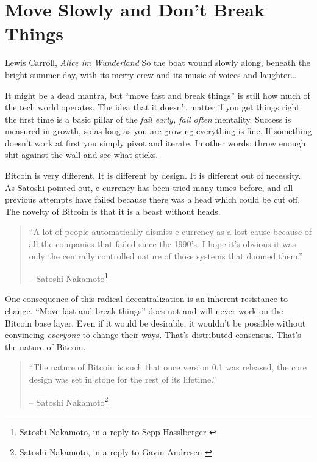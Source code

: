 \chapter{Move Slowly and Don't Break Things}
\label{les:18}

\begin{chapquote}{Lewis Carroll, \textit{Alice im Wunderland}}
So the boat wound slowly along, beneath the bright summer-day, with its merry crew and its music of voices and laughter\ldots
\end{chapquote}

It might be a dead mantra, but \enquote{move fast and break things} is still how
much of the tech world operates. The idea that it doesn't matter if you
get things right the first time is a basic pillar of the \textit{fail early,
fail often} mentality. Success is measured in growth, so as long as you
are growing everything is fine. If something doesn't work at first you
simply pivot and iterate. In other words: throw enough shit against the
wall and see what sticks.

Bitcoin is very different. It is different by design. It is different
out of necessity. As Satoshi pointed out, e-currency has been tried
many times before, and all previous attempts have failed because there
was a head which could be cut off. The novelty of Bitcoin is that it is
a beast without heads.

\begin{quotation}\begin{samepage}
\enquote{A lot of people automatically dismiss e-currency as a lost cause
because of all the companies that failed since the 1990's. I hope it's
obvious it was only the centrally controlled nature of those systems
that doomed them.}
\begin{flushright} -- Satoshi Nakamoto\footnote{Satoshi Nakamoto, in a reply to Sepp Hasslberger \cite{satoshi-centralized-nature}}
\end{flushright}\end{samepage}\end{quotation}

One consequence of this radical decentralization is an inherent
resistance to change. \enquote{Move fast and break things} does not and will
never work on the Bitcoin base layer. Even if it would be desirable, it
wouldn't be possible without convincing \textit{everyone} to change their ways.
That's distributed consensus. That's the nature of Bitcoin.

\begin{quotation}\begin{samepage}
\enquote{The nature of Bitcoin is such that once version 0.1 was released, the
core design was set in stone for the rest of its lifetime.}
\begin{flushright} -- Satoshi Nakamoto\footnote{Satoshi Nakamoto, in a reply to Gavin Andresen \cite{satoshi-centralized-nature}}
\end{flushright}\end{samepage}\end{quotation}

